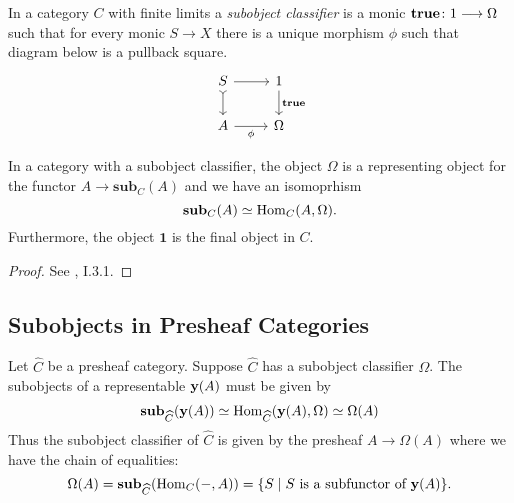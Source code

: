 \begin{definition}
	In a category $C$ with finite limits a \textit{subobject classifier} is a monic $\mathbf{true} \colon 1 \longrightarrow \Omega$ such that for every monic $S \to X$ there is a unique morphism $\phi$ such that diagram below is a pullback square.
	\[
		\begin{tikzcd}
			S & 1 \\
			A & \Omega
			\arrow[tail, from=1-1, to=2-1]
			\arrow[from=1-1, to=1-2]
			\arrow["{\true}", from=1-2, to=2-2]
			\arrow["\phi"', from=2-1, to=2-2]
		\end{tikzcd}
	\]
\end{definition}

\begin{proposition}
	In a category with a subobject classifier, the object $\Omega$ is a representing object for the functor $A \to \mathbf{sub}_C(A)$ and we have an isomoprhism
	\[ \mathbf{sub}_C(A) \simeq \operatorname{Hom}_C(A,\Omega).\]
	Furthermore, the object $\mathbf{1}$ is the final object in $C$.
\end{proposition}

\begin{proof}
	See \cite{SIGL}, I.3.1.
\end{proof}

\subsection{Subobjects in Presheaf Categories}\label{section:presheaf_subobjects}

\begin{construction}
	Let $\widehat{C}$ be a presheaf category. Suppose $\widehat{C}$ has a subobject classifier $\Omega$. The subobjects of a representable $\mathbf{y}(A)$ must be given by
	\[
		\mathbf{sub}_{\widehat{C}}(\mathbf{y}(A)) \simeq \operatorname{Hom}_{\widehat{C}}(\mathbf{y}(A), \Omega) \simeq \Omega(A)
	\]
	Thus the subobject classifier of $\widehat{C}$ is given by the presheaf $A \to \Omega(A)$ where we have the chain of equalities:
	\[
		\Omega(A)  = \mathbf{sub}_{\widehat{C}}(\operatorname{Hom}_C(-,A))  = \{S \mid S \text{ is a subfunctor of $\mathbf{y}(A)$}\}.
	\]
\end{construction}


